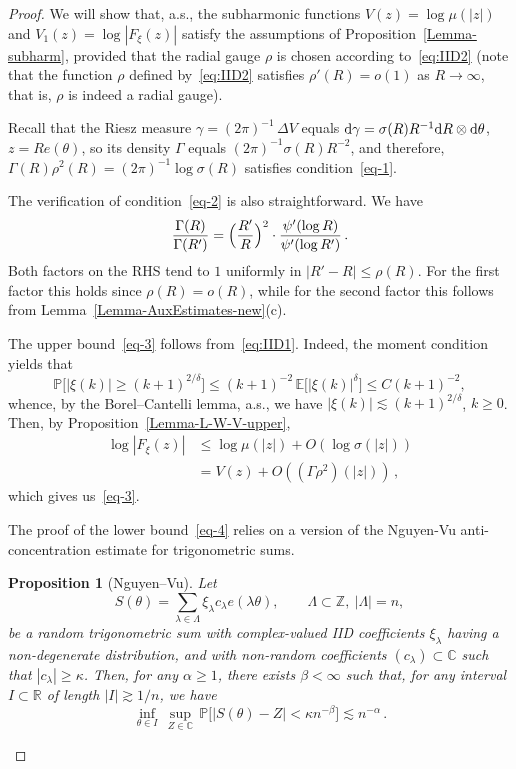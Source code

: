\documentclass[11pt]{amsart}
\numberwithin{equation}{section}
\newtheorem{proposition}{Proposition}
\newcommand{\bR}{\mathbb R}
\newcommand{\bC}{\mathbb C}
\newcommand{\bZ}{\mathbb Z}
\newcommand{\bP}{\mathbb P}
\newcommand{\bE}{\mathbb E}
\begin{document}
\begin{proof}
We will show that, a.s., the subharmonic functions $V(z)=\log\mu (|z|)$ and
$V_1(z) = \log |F_\xi(z)|$ satisfy the assumptions of Proposition~\ref{Lemma-subharm}, provided that
the radial gauge $\rho$ is chosen according to~\eqref{eq:IID2} (note that
the function $\rho$ defined by~\eqref{eq:IID2} satisfies $\rho'(R) = o(1)$ as $R\to\infty$, that is, $\rho$ is indeed a radial gauge).


Recall that the Riesz measure $\gamma = (2\pi)^{-1}\, \Delta V$ equals
${\rm d}\gamma = \sigma (R)R^{-1}{\rm d}R \otimes {\rm d}\theta$, $z=Re(\theta)$, so its
density $\Gamma$ equals $(2\pi)^{-1}\sigma (R) R^{-2}$, and therefore,
$\Gamma (R) \rho^2(R) = (2\pi)^{-1}\log\sigma (R)$ satisfies condition~\eqref{eq-1}.

The verification of condition~\eqref{eq-2} is also straightforward. We have
\[
\frac{\Gamma (R)}{\Gamma (R')} = \Bigl( \frac{R'}R \Bigr)^2 \cdot
\frac{\psi'(\log R)}{\psi' (\log R')}\,.
\]
Both factors on the RHS tend to $1$ uniformly in $|R'-R|\le \rho(R)$.
For the first factor this holds since $\rho (R) = o(R)$, while for the second factor
this follows from Lemma~\ref{Lemma-AuxEstimates-new}(c).

The upper bound~\eqref{eq-3} follows from~\eqref{eq:IID1}. Indeed,
the moment condition yields that
\[
\bP\bigl[ |\xi (k)| \ge (k+1)^{2/\delta} \bigr]
\le (k+1)^{-2}\, \bE\bigl[ |\xi (k)|^{\delta} \bigr] \le C(k+1)^{-2},
\]
whence, by the Borel--Cantelli lemma, a.s., we have $|\xi (k)| \lesssim (k+1)^{2/\delta}$,
$k\ge 0$. Then, by Proposition~\ref{Lemma-L-W-V-upper},
\begin{align*}
\log |F_\xi (z)| &\le \log\mu (|z|) + O(\log\sigma (|z|)) \\
&= V(z) + O((\Gamma \rho^2)(|z|))\,,
\end{align*}
which gives us~\eqref{eq-3}.

The proof of the lower bound~\eqref{eq-4} relies on a version of the Nguyen-Vu
anti-concentration estimate for trigonometric sums.

\begin{proposition}[Nguyen--Vu]\label{lemma-Nguyen-Vu}
Let
\[
S(\theta) = \sum_{\lambda\in\Lambda} \xi_\lambda c_\lambda e(\lambda\theta),
\qquad \Lambda\subset\bZ, \ |\Lambda| = n,
\]
be a random trigonometric sum with complex-valued IID coefficients $\xi_\lambda$
having a non-degenerate
distribution, and with non-random coefficients $(c_\lambda)\subset\bC$ such that
$|c_\lambda|\ge \kappa$. Then, for any $\alpha \ge 1$, there exists $\beta<\infty$ such that,
for any interval $I\subset\bR$ of length $|I| \gtrsim 1/n$, we have
\[
\inf_{\theta\in I}\, \sup_{Z\in\bC}\,
\bP\bigl[ |S(\theta)-Z| < \kappa n^{-\beta} \bigr] \lesssim n^{-\alpha}\,.
\]
\end{proposition}


\end{proof}
\end{document}
